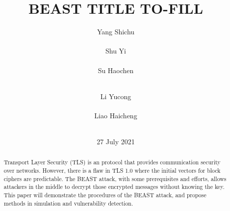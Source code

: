 \documentclass{acm_proc_article-sp}
\begin{document}
\title{
BEAST TITLE TO-FILL
}
\author{
\alignauthor
Yang Shichu\\
    \\
\alignauthor
Shu Yi\\
    \\
\alignauthor
Su Haochen\\
    \\
\and
\alignauthor
Li Yucong\\
    \\
\alignauthor
Liao Haicheng\\
    \\
}
\date{27 July 2021}
\maketitle
\begin{abstract}
Transport Layer Security (TLS) is an protocol that provides communication
security over networks. However, there is a flaw in TLS 1.0 where the initial
vectors for block ciphers are predictable. The BEAST attack, with some
prerequisites and efforts, allows attackers in the middle to decrypt those
encrypted messages without knowing the key.
This paper will demonstrate the procedures of the BEAST attack, and propose
methods in simulation and vulnerability detection.
\end{abstract}


\end{document}
